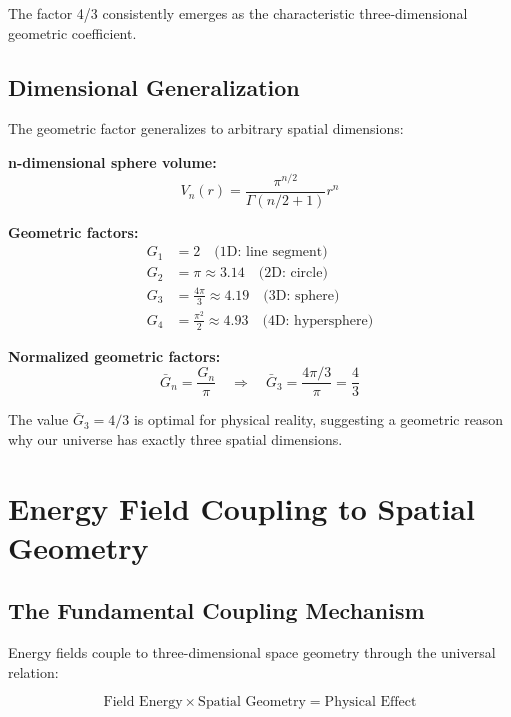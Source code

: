 \documentclass[12pt,a4paper]{report}
\begin{document}
	The factor 4/3 consistently emerges as the characteristic three-dimensional geometric coefficient.
	
	\subsection{Dimensional Generalization}
	\label{subsec:dimensional_generalization}
	
	The geometric factor generalizes to arbitrary spatial dimensions:
	
	\textbf{n-dimensional sphere volume:}
	\begin{equation}
		V_n(r) = \frac{\pi^{n/2}}{\Gamma(n/2 + 1)} r^n
	\end{equation}
	
	\textbf{Geometric factors:}
	\begin{align}
		G_1 &= 2 \quad \text{(1D: line segment)} \\
		G_2 &= \pi \approx 3.14 \quad \text{(2D: circle)} \\
		G_3 &= \frac{4\pi}{3} \approx 4.19 \quad \text{(3D: sphere)} \\
		G_4 &= \frac{\pi^2}{2} \approx 4.93 \quad \text{(4D: hypersphere)}
	\end{align}
	
	\textbf{Normalized geometric factors:}
	\begin{equation}
		\bar{G}_n = \frac{G_n}{\pi} \quad \Rightarrow \quad \bar{G}_3 = \frac{4\pi/3}{\pi} = \frac{4}{3}
	\end{equation}
	
	The value $\bar{G}_3 = 4/3$ is optimal for physical reality, suggesting a geometric reason why our universe has exactly three spatial dimensions.
	
	\section{Energy Field Coupling to Spatial Geometry}
	\label{sec:energy_field_coupling}
	
	\subsection{The Fundamental Coupling Mechanism}
	\label{subsec:coupling_mechanism}
	
	Energy fields couple to three-dimensional space geometry through the universal relation:
	
	\begin{equation}
		\text{Field Energy} \times \text{Spatial Geometry} = \text{Physical Effect}
	\end{equation}
	
\end{document}
